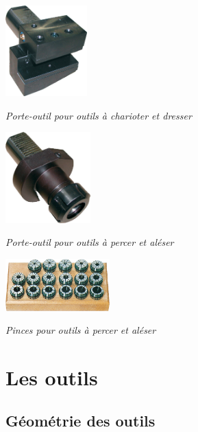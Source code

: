 \documentclass[11pt,oneside]{article}
\begin{document}
\begin{minipage}[c]{.3\linewidth}
\begin{center}
\includegraphics[height=3.5cm]{png/vdi_1}

\textit{Porte-outil pour outils à charioter et dresser}
\end{center}
\end{minipage}\hfill
\begin{minipage}[c]{.3\linewidth}
\begin{center}
\includegraphics[height=3.5cm]{png/vdi_2}

\textit{Porte-outil pour outils à percer et aléser}
\end{center}
\end{minipage}\hfill
\begin{minipage}[c]{.3\linewidth}
\begin{center}
\includegraphics[height=2cm]{png/pinces}

\textit{Pinces pour outils à percer et aléser}
\end{center}
\end{minipage}

\section{Les outils}
\subsection{Géométrie des outils}
\end{document}
